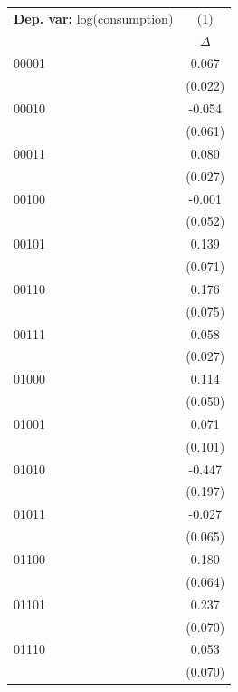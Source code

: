 \begin{tabular}{l c} \toprule  \textbf{Dep. var:}  log(consumption) 
                    &\multicolumn{1}{c}{(1)}         \\
                    &    $\Delta$         \\
00001               &       0.067\sym{***}\\
                    &     (0.022)         \\
00010               &      -0.054         \\
                    &     (0.061)         \\
00011               &       0.080\sym{***}\\
                    &     (0.027)         \\
00100               &      -0.001         \\
                    &     (0.052)         \\
00101               &       0.139\sym{**} \\
                    &     (0.071)         \\
00110               &       0.176\sym{**} \\
                    &     (0.075)         \\
00111               &       0.058\sym{**} \\
                    &     (0.027)         \\
01000               &       0.114\sym{**} \\
                    &     (0.050)         \\
01001               &       0.071         \\
                    &     (0.101)         \\
01010               &      -0.447\sym{**} \\
                    &     (0.197)         \\
01011               &      -0.027         \\
                    &     (0.065)         \\
01100               &       0.180\sym{***}\\
                    &     (0.064)         \\
01101               &       0.237\sym{***}\\
                    &     (0.070)         \\
01110               &       0.053         \\
                    &     (0.070)         \\

\end{tabular}
